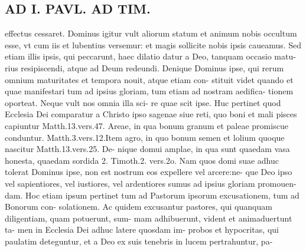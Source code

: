 \documentclass{article}
\begin{document}
\begin{pages}
\section*{AD I. PAVL. AD TIM. }
\marginpar{[ p.386 ]}\pstart effectus cessaret. Dominus igitur vult aliorum statum et animum nobis occultum esse, vt cum iis et lubentius versemur: et magis sollicite nobis ipsis caueamus. Sed etiam illis ipsis, qui peccarunt, haec dilatio datur a Deo, tanquam occasio matu- rius resipiscendi, atque ad Deum redeundi. Denique Dominus ipse, qui rerum omnium maturitates et tempora nouit, atque etiam con- stituit videt quando et quae manifestari tum ad ipsius gloriam, tum etiam ad nostram aedifica- tionem oporteat. Neque vult nos omnia illa sci- re quae scit ipse. Huc pertinet quod Ecclesia Dei comparatur a Christo ipso sagenae siue reti, quo boni et mali pisces capiuntur Matth.13.vers.47. Areae, in qua bonum granum et paleae promiscue conduntur. Matth.3.vers.12.Item agro, in quo bonum semen et lolium quoque nascitur Matth.13.vers.25. De- nique domui amplae, in qua sunt quaedam vasa honesta, quaedam sordida 2. Timoth.2. vers.2o. Nam quos domi suae adhuc tolerat Dominus ipse, non est nostrum eos expellere vel arcere:ne- que Deo ipso vel sapientiores, vel iustiores, vel ardentiores sumus ad ipsius gloriam promouen- dam. Hoc etiam ipsum pertinet tum ad Pastorum ipsorum excusationem, tum ad Bonorum con- solationem. Ac quidem excusantur pastores, qui quanquam diligentiam, quam potuerunt, sum- mam adhibuerunt, vident et animaduertunt ta- men in Ecclesia Dei adhuc latere quosdam im- probos et hypocritas, qui paulatim deteguntur, et a Deo ex suis tenebris in lucem pertrahuntur, pa-  \pend

\end{pages}
\end{document}
